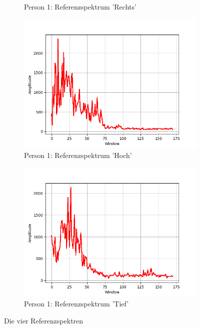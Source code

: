\documentclass[12pt, oneside, a4paper, \docLanguage]{report}
\begin{document}
\begin{figure}[H]
\begin{subfigure}{.5\textwidth}
  		\caption{Person 1: Referenzspektrum 'Rechts'}
  		\label{fig:sub2}
	\end{subfigure}
\begin{subfigure}{.5\textwidth}
  		\centering
 		 \includegraphics[width=.95\linewidth]{../data/img/Versuch2/2Averagehoch.png}
  		\caption{Person 1: Referenzspektrum 'Hoch'}
 		 \label{fig:sub3}
	\end{subfigure}%
	\begin{subfigure}{.5\textwidth}
  		\centering
 		 \includegraphics[width=.95\linewidth]{../data/img/Versuch2/2Averagetief.png}
  		\caption{Person 1: Referenzspektrum 'Tief'}
  		\label{fig:sub4}
	\end{subfigure}
	\caption{Die vier Referenzspektren}
	\label{fig:2test}
\end{figure}
\end{document}

